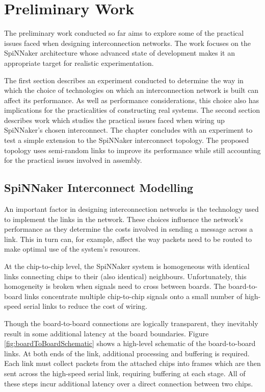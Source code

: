 \chapter{Preliminary Work}
	
	The preliminary work conducted so far aims to explore some of the practical
	issues faced when designing interconnection networks. The work focuses on the
	SpiNNaker architecture whose advanced state of development makes it an
	appropriate target for realistic experimentation.
	
	The first section describes an experiment conducted to determine the way in
	which the choice of technologies on which an interconnection network is built
	can affect its performance. As well as performance considerations, this choice
	also has implications for the practicalities of constructing real systems. The
	second section describes work which studies the practical issues faced when
	wiring up SpiNNaker's chosen interconnect. The chapter concludes with an
	experiment to test a simple extension to the SpiNNaker interconnect topology.
	The proposed topology uses semi-random links to improve its performance while
	still accounting for the practical issues involved in assembly.
	
	\section{SpiNNaker Interconnect Modelling}
		
		\label{sec:interconnect-modelling}
		
		An important factor in designing interconnection networks is the technology
		used to implement the links in the network. These choices influence the
		network's performance as they determine the costs involved in sending a
		message across a link. This in turn can, for example, affect the way packets
		need to be routed to make optimal use of the system's resources.
		
		At the chip-to-chip level, the SpiNNaker system is homogeneous with
		identical links connecting chips to their (also identical) neighbours.
		Unfortunately, this homogeneity is broken when signals need to cross between
		boards. The board-to-board links concentrate multiple chip-to-chip signals
		onto a small number of high-speed serial links to reduce the cost of wiring.
		
		Though the board-to-board connections are logically transparent, they
		inevitably result in some additional latency at the board boundaries. Figure
		\ref{fig:boardToBoardSchematic} shows a high-level schematic of the
		board-to-board links. At both ends of the link, additional processing and
		buffering is required. Each link must collect packets from the attached
		chips into frames which are then sent across the high-speed serial link,
		requiring buffering at each stage. All of these steps incur additional
		latency over a direct connection between two chips.
		
